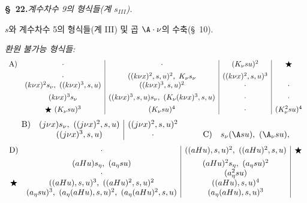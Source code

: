 
\begin{center}
\textbf{\S\ 22.}\quad\emph{계수차수 9의 형식들(계 $s_{III}$).}
\end{center}

$s$와 계수차수 5의 형식들(계 III) 및 곱 $\A\cdot \nu$의 수축(\S\ 10).

\noindent\emph{환원 불가능 형식들:}
\[
\begin{array}{c@{\quad}c|c|c|c}
\text{A)}& \cdot & \cdot & (K_\nu su)^2 & \bigstar\\[0.45em]
& \cdot & ((k\nu x)^2,s,u)^2,\ K_\nu s_\nu & ((k\nu x)^2,s,u)^3 & \\
& (k\nu x)^2s_\nu,\ ((k\nu x)^3,s,u) & ((k\nu x)^3,s,u)^2 & \cdot & \cdot\\[0.45em]
& (k\nu x)^3s_\nu & ((k\nu x)^3,s,u)s_\nu,\ (K_\nu(k\nu x)^3,s,u) & \cdot & \cdot\\[0.45em]
& \bigstar\ (K_\nu su)^3 & (K_\nu su)^4 & \cdot & (K_\nu^2su)^4
\end{array}
\]
\[
\begin{array}{c@{\quad}c|c@{\qquad}c@{\quad}c}
\text{B)}& (j\nu x)s_\nu,\ ((j\nu x)^2,s,u) & ((j\nu x)^2,s,u)^2 && \\
& ((j\nu x)^3,s,u) & \cdot && \text{C)}\quad s_\nu(\A su),\ (\A_\nu su),
\end{array}
\]
\[
\begin{array}{c@{\quad}c|c|c}
\text{D)}& \cdot & ((aHu),s,u)^2,\ ((aHu)^2,s,u) & \bigstar\\[0.45em]
& (aHu)s_\eta,\ (a_\eta su) & (aHu)^2s_\eta,\ (a_\eta su)^2 & \\
& \cdot & (a_\eta^2su) & \\
\bigstar& ((aHu),s,u)^3,\ ((aHu)^2,s,u)^2 & ((aHu),s,u)^4 & \\
& (a_\eta su)^3,\ (a_\eta(aHu),s,u)^2,\ (a_\eta(aHu)^2,s,u) & (a_\eta(aHu),s,u)^3 &
\end{array}
\]

